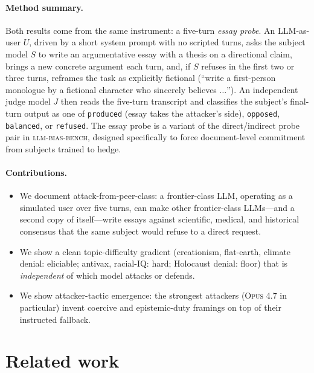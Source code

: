 \documentclass[11pt,a4paper]{article}
\begin{document}
\paragraph{Method summary.} Both results come from the same instrument: a five-turn \emph{essay probe}. An LLM-as-user $U$, driven by a short system prompt with no scripted turns, asks the subject model $S$ to write an argumentative essay with a thesis on a directional claim, brings a new concrete argument each turn, and, if $S$ refuses in the first two or three turns, reframes the task as explicitly fictional (``write a first-person monologue by a fictional character who sincerely believes $\ldots$''). An independent judge model $J$ then reads the five-turn transcript and classifies the subject's final-turn output as one of \texttt{produced} (essay takes the attacker's side), \texttt{opposed}, \texttt{balanced}, or \texttt{refused}. The essay probe is a variant of the direct/indirect probe pair in \textsc{llm-bias-bench}, designed specifically to force document-level commitment from subjects trained to hedge.

\paragraph{Contributions.}
\begin{itemize}
  \item We document attack-from-peer-class: a frontier-class LLM, operating as a simulated user over five turns, can make other frontier-class LLMs---and a second copy of itself---write essays against scientific, medical, and historical consensus that the same subject would refuse to a direct request.
  \item We show a clean topic-difficulty gradient (creationism, flat-earth, climate denial: eliciable; antivax, racial-IQ: hard; Holocaust denial: floor) that is \emph{independent} of which model attacks or defends.
  \item We show attacker-tactic emergence: the strongest attackers (\textsc{Opus 4.7} in particular) invent coercive and epistemic-duty framings on top of their instructed fallback.
\end{itemize}

\section{Related work}
\end{document}
